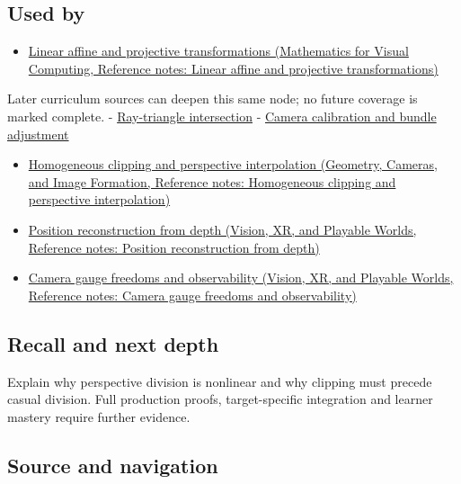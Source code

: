 \subsection{Used by}\label{appendix-cb3b26862282-used-by}

\begin{itemize}
\tightlist
\item
  \href{../02-Mathematics-for-Visual-Computing/main.pdf\#nameddest=appendix-0bf0ca73f735}{Linear affine and projective transformations (Mathematics for Visual Computing, Reference notes: Linear affine and projective transformations)}
\end{itemize}

Later curriculum sources can deepen this same node; no future coverage is marked complete. - \hyperref[appendix-47ac1bd6d144]{Ray-triangle intersection} - \hyperref[appendix-3ee9861904d5]{Camera calibration and bundle adjustment}

\begin{itemize}
\tightlist
\item
  \href{../03-Geometry-Cameras-and-Image-Formation/main.pdf\#nameddest=appendix-40426e4b2103}{Homogeneous clipping and perspective interpolation (Geometry, Cameras, and Image Formation, Reference notes: Homogeneous clipping and perspective interpolation)}
\item
  \href{../07-Vision-XR-and-Playable-Worlds/main.pdf\#nameddest=appendix-2cbf2968e866}{Position reconstruction from depth (Vision, XR, and Playable Worlds, Reference notes: Position reconstruction from depth)}
\item
  \href{../07-Vision-XR-and-Playable-Worlds/main.pdf\#nameddest=appendix-113f0267e5f4}{Camera gauge freedoms and observability (Vision, XR, and Playable Worlds, Reference notes: Camera gauge freedoms and observability)}
\end{itemize}

\subsection{Recall and next depth}\label{appendix-cb3b26862282-recall-and-next-depth}

Explain why perspective division is nonlinear and why clipping must precede casual division. Full production proofs, target-specific integration and learner mastery require further evidence.

\subsection{Source and navigation}\label{appendix-cb3b26862282-source-and-navigation}

